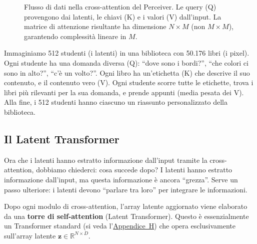 \documentclass[12pt,a4paper]{article}
\begin{document}
\begin{figure}[H]
\caption{Flusso di dati nella cross-attention del Perceiver. Le query (Q) provengono dai latenti, le chiavi (K) e i valori (V) dall'input. La matrice di attenzione risultante ha dimensione $N \times M$ (non $M \times M$), garantendo complessit\`a lineare in $M$.}
\label{fig:cross_attention_flow}
\end{figure}


\begin{notabox}
Immaginiamo 512 studenti (i latenti) in una biblioteca con 50.176 libri (i pixel). Ogni studente ha una domanda diversa (Q): ``dove sono i bordi?'', ``che colori ci sono in alto?'', ``c'\`e un volto?''. Ogni libro ha un'etichetta (K) che descrive il suo contenuto, e il contenuto vero (V). Ogni studente scorre tutte le etichette, trova i libri pi\`u rilevanti per la sua domanda, e prende appunti (media pesata dei V). Alla fine, i 512 studenti hanno ciascuno un riassunto personalizzato della biblioteca.
\end{notabox}

\subsection{Il Latent Transformer} \label{sec:latent_transformer}

Ora che i latenti hanno estratto informazione dall'input tramite la cross-attention, dobbiamo chiederci: cosa succede dopo? I latenti hanno estratto informazione dall'input, ma questa informazione \`e ancora ``grezza''. Serve un passo ulteriore: i latenti devono ``parlare tra loro'' per integrare le informazioni.

Dopo ogni modulo di cross-attention, l'array latente aggiornato viene elaborato da una \textbf{torre di self-attention} (Latent Transformer). Questo \`e essenzialmente un Transformer standard (si veda l'\hyperref[app:transformer]{Appendice~H}) che opera esclusivamente sull'array latente $\mathbf{z} \in \mathbb{R}^{N \times D}$.
\end{document}
